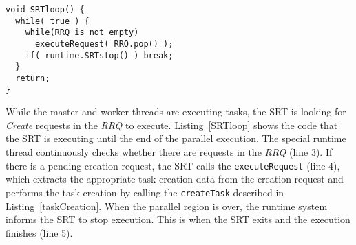 \begin{lstlisting}[float, emph={SRTloop}, caption={Pseudo-code for the SRT loop.},label=SRTloop]
void SRTloop() {
  while( true ) {   
    while(RRQ is not empty) 
      executeRequest( RRQ.pop() );
    if( runtime.SRTstop() ) break;
  }
  return; 
}  
\end{lstlisting}

While the master and worker threads are executing tasks, the SRT is looking for \textit{Create} requests in the \textit{RRQ} to execute.
Listing~\ref{SRTloop} shows the code that the SRT is executing until the end of the parallel execution.
The special runtime thread continuously checks whether there are requests in the \textit{RRQ} (line 3). 
If there is a pending creation request, the SRT calls the \texttt{executeRequest} (line 4), which extracts the appropriate task creation data from the creation request and performs the task creation by calling the \texttt{createTask} described in Listing~\ref{taskCreation}.
When the parallel region is over, the runtime system informs the SRT to stop execution.
This is when the SRT exits and the execution finishes (line 5).







